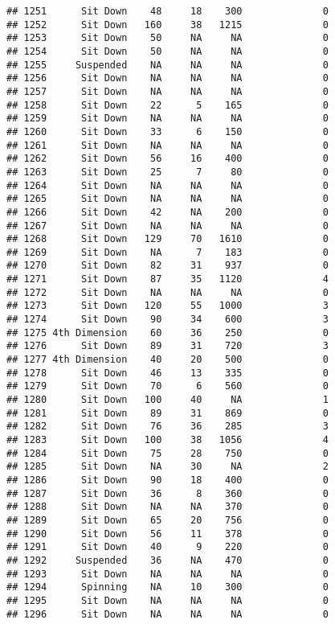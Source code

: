 \documentclass[
]{article}
\begin{document}
\begin{verbatim}
## 1251      Sit Down    48     18    300              0
## 1252      Sit Down   160     38   1215              0
## 1253      Sit Down    50     NA     NA              0
## 1254      Sit Down    50     NA     NA              0
## 1255     Suspended    NA     NA     NA              0
## 1256      Sit Down    NA     NA     NA              0
## 1257      Sit Down    NA     NA     NA              0
## 1258      Sit Down    22      5    165              0
## 1259      Sit Down    NA     NA     NA              0
## 1260      Sit Down    33      6    150              0
## 1261      Sit Down    NA     NA     NA              0
## 1262      Sit Down    56     16    400              0
## 1263      Sit Down    25      7     80              0
## 1264      Sit Down    NA     NA     NA              0
## 1265      Sit Down    NA     NA     NA              0
## 1266      Sit Down    42     NA    200              0
## 1267      Sit Down    NA     NA     NA              0
## 1268      Sit Down   129     70   1610              0
## 1269      Sit Down    NA      7    183              0
## 1270      Sit Down    82     31    937              0
## 1271      Sit Down    87     35   1120              4
## 1272      Sit Down    NA     NA     NA              0
## 1273      Sit Down   120     55   1000              3
## 1274      Sit Down    90     34    600              3
## 1275 4th Dimension    60     36    250              0
## 1276      Sit Down    89     31    720              3
## 1277 4th Dimension    40     20    500              0
## 1278      Sit Down    46     13    335              0
## 1279      Sit Down    70      6    560              0
## 1280      Sit Down   100     40     NA              1
## 1281      Sit Down    89     31    869              0
## 1282      Sit Down    76     36    285              3
## 1283      Sit Down   100     38   1056              4
## 1284      Sit Down    75     28    750              0
## 1285      Sit Down    NA     30     NA              2
## 1286      Sit Down    90     18    400              0
## 1287      Sit Down    36      8    360              0
## 1288      Sit Down    NA     NA    370              0
## 1289      Sit Down    65     20    756              0
## 1290      Sit Down    56     11    378              0
## 1291      Sit Down    40      9    220              0
## 1292     Suspended    36     NA    470              0
## 1293      Sit Down    NA     NA     NA              0
## 1294      Spinning    NA     10    300              0
## 1295      Sit Down    NA     NA     NA              0
## 1296      Sit Down    NA     NA     NA              0

\end{verbatim}
\end{document}
